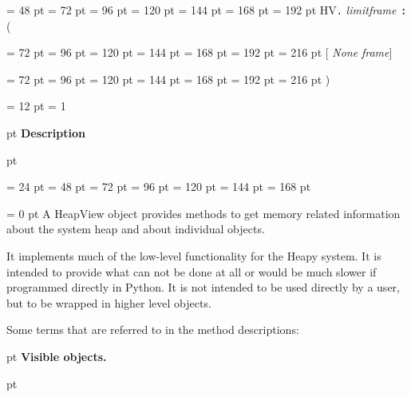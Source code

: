 {{{{\par \noindent  \leftskip = 48 pt  \leftmargini = 72 pt  \leftmarginii = 96 pt  \leftmarginiii = 120 pt  \leftmarginiv = 144 pt  \leftmarginv = 168 pt  \leftmarginvi = 192 pt HV{\large {\tt .\/} {\em limitframe\/}}~{\bf :}  ({\par \noindent
{\par \noindent  \leftskip = 72 pt  \leftmargini = 96 pt  \leftmarginii = 120 pt  \leftmarginiii = 144 pt  \leftmarginiv = 168 pt  \leftmarginv = 192 pt  \leftmarginvi = 216 pt {\bf {}\/}{[} {\em None\/}{\bf {}\/} {\em frame\/}]\par}
{\par \noindent  \leftskip = 72 pt  \leftmargini = 96 pt  \leftmarginii = 120 pt  \leftmarginiii = 144 pt  \leftmarginiv = 168 pt  \leftmarginv = 192 pt  \leftmarginvi = 216 pt  )\par}
\par}
\par}
\par}
\par}
{\par \pagebreak[3.300000] \noindent \hangindent = 12 pt \hangafter = 1 
{\par \pagebreak[3]  pt \noindent
{\Large {\bf Description\/}}\par {} pt
} \noindent
\par}
{\par \noindent  \leftskip = 24 pt  \leftmargini = 48 pt  \leftmarginii = 72 pt  \leftmarginiii = 96 pt  \leftmarginiv = 120 pt  \leftmarginv = 144 pt  \leftmarginvi = 168 pt {\par \parindent = 0 pt 
A HeapView object provides methods to get memory related information
about the system heap and about individual objects.
 \par}
{\par 
It implements much of the low-level functionality for the Heapy
system. It is intended to provide what can not be done at all or would
be much slower if programmed directly in Python. It is not intended to
be used directly by a user, but to be wrapped in higher level objects.
 \par}
{\par 
Some terms that are referred to in the method descriptions:
 \par}
{\par \pagebreak[2]  pt \noindent
{\large {\bf  Visible objects.\/}}\par {} pt
}}}
